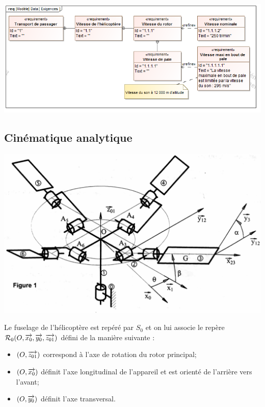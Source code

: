 \documentclass[10pt,fleqn]{article} %
\begin{document}
\begin{multicols}{2}
\begin{multicols}{2}

\begin{center}
\includegraphics[width=\linewidth]{images/SysML/Exigences}
\end{center}
\fi
\subsection*{Cinématique analytique}
\ifprof
\else
\begin{center}
\includegraphics[width=.8\linewidth]{images/fig2}
\end{center}

Le fuselage de l'hélicoptère est repéré par $S_0$ et on lui associe le repère $\mathcal{R}_0(O,\overrightarrow{x_0},\overrightarrow{y_0},\overrightarrow{z_{01}})$ défini de la
manière suivante :
\begin{itemize}
\item $(O,\overrightarrow{z_{01}})$ correspond à l'axe de rotation du rotor principal;
\item $(O, \overrightarrow{x_0} )$ définit l'axe longitudinal de l'appareil et est orienté de l'arrière vers l'avant;
\item $(O, \overrightarrow{y_0} )$ définit l'axe transversal.
\end{itemize}


\end{multicols}
\end{multicols}
\end{document}
